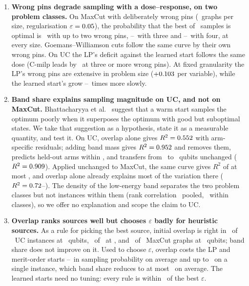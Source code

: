 \begin{enumerate}
\item \textbf{Wrong pins degrade sampling with a dose--response, on two problem classes.} On MaxCut with deliberately wrong pins (\MCGraphs\ graphs per size, regularisation $\varepsilon=0.05$), the probability that the best of \KMax\ samples is optimal is \MCDoseTwoMin\ with up to two wrong pins, \MCDoseThreeMin--\MCDoseThreeMax\ with three and \MCDoseFourMin--\MCDoseFourMax\ with four, at every size. Goemans--Williamson cuts follow the same curve by their own wrong pins. On UC the LP's deficit against the learned start follows the same dose (C-milp leads by \DoseLtwoThree\ at three or more wrong pins). At fixed granularity the LP's wrong pins are extensive in problem size ($+0.103$ per variable), while the learned start's grow \SlopeRatioMin--\SlopeRatioMax\ times more slowly.
\item \textbf{Band share explains sampling magnitude on UC, and not on MaxCut.} Bhattacharyya et al.~\cite{bhattacharyya2025qubo} suggest that a warm start samples the optimum poorly when it superposes the optimum with good but suboptimal states. We take that suggestion as a hypothesis, state it as a measurable quantity, and test it. On UC, overlap alone gives $R^2=0.552$ with arm-specific residuals; adding band mass gives $R^2=0.952$ and removes them, predicts held-out arms within \BSHeldOutBandMax, and transfers from \NLtwo\ to \NLfour\ qubits unchanged ($R^2=0.909$). Applied unchanged to MaxCut, the same curve gives $R^2$ of at most \MCTransferSixteen, and overlap alone already explains most of the variation there ($R^2=0.72$--\MCOvTwelve). The density of the low-energy band separates the two problem classes but not instances within them (rank correlation \BDPooled\ pooled, \BDWithin\ within classes), so we offer no explanation and scope the claim to UC.
\item \textbf{Overlap ranks sources well but chooses $\varepsilon$ badly for heuristic sources.} As a rule for picking the best source, initial overlap is right in \RKUCSixteenOv\ of \RKUCSixteenN\ UC instances at \NLtwo\ qubits, \RKUCTwentyTwoOv\ of \RKUCTwentyTwoN\ at \NLfour, and \RKMCTwentyOv\ of \RKMCTwentyN\ MaxCut graphs at \MCSizeTwenty\ qubits; band share does not improve on it. Used to choose $\varepsilon$, overlap costs the LP and merit-order starts \ERDOvSixteen--\ERFOvSixteen\ in sampling probability on average and up to \EROvWorst\ on a single instance, which band share reduces to at most \ERBandMeanMax\ on average. The learned starts need no tuning: every rule is within \ERLearnedMax\ of the best $\varepsilon$.

\end{enumerate}
